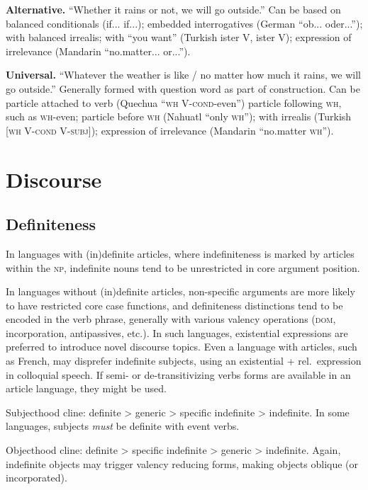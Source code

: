 \documentclass[11pt]{article}
\newcommand{\I}[1]{\textsc{#1}}   %
\begin{document}
{\textbf{Alternative.} ``Whether it rains or not, we will go outside.''
Can be based on balanced conditionals (if... if...); embedded
interrogatives (German ``ob... oder...''); with balanced irrealis;
with ``you want'' (Turkish ister V, ister V); expression of
irrelevance (Mandarin ``no.matter... or...'').

\textbf{Universal.} ``Whatever the weather is like / no matter how much
it rains, we will go outside.''  Generally formed with question word
as part of construction.  Can be particle attached to verb (Quechua
``\I{wh} V-\I{cond}-even'') particle following \I{wh}, such as
\I{wh}-even; particle before \I{wh} (Nahuatl ``only \I{wh}''); with
irrealis (Turkish [\I{wh V-cond V-subj}]); expression of irrelevance
(Mandarin ``no.matter \I{wh}'').


\section{Discourse}

\subsection{Definiteness}
In languages with (in)definite articles, where indefiniteness is
marked by articles within the \I{np}, indefinite nouns tend to be
unrestricted in core argument position.

In languages without (in)definite articles, non-specific arguments are
more likely to have restricted core case functions, and definiteness
distinctions tend to be encoded in the verb phrase, generally with
various valency operations (\I{dom}, incorporation, antipassives,
etc.).  In such languages, existential expressions are preferred to
introduce novel discourse topics.  Even a language with articles, such
as French, may disprefer indefinite subjects, using an existential +
rel.\ expression in colloquial speech.  If semi- or de-transitivizing
verbs forms are available in an article language, they might be used.

Subjecthood cline: definite > generic > specific indefinite >
indefinite.  In some languages, subjects \textit{must} be definite
with event verbs.

Objecthood cline: definite > specific indefinite > generic >
indefinite.  Again, indefinite objects may trigger valency reducing
forms, making objects oblique (or incorporated).

}
\end{document}
